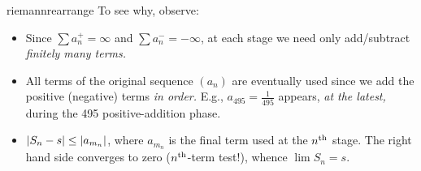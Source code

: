 \begin{example}{}{riemannrearrange}
	To see why, observe:
	\begin{itemize}
	  \item Since $\sum a_n^+=\infty$ and $\sum a_n^-=-\infty$, at each stage we need only add/subtract \emph{finitely many terms.}
	  \item All terms of the original sequence $(a_n)$ are eventually used since we add the positive (negative) terms \emph{in order.} E.g., $a_{495}=\frac 1{495}$ appears, \emph{at the latest,} during the 495\th{} positive-addition phase.
	  \item $\left| S_n-s\right|\le \left| a_{m_n}\right|$, where $a_{m_n}$ is the final term used at the $n\textsuperscript{th}$ stage. The right hand side converges to zero ($n\textsuperscript{th}$-term test!), whence $\lim S_n=s$. 
	\end{itemize}
\end{example}


